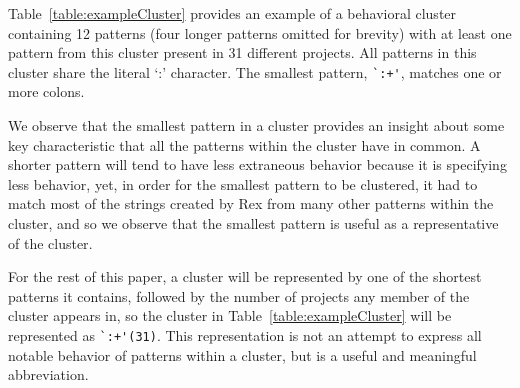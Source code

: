 


Table~\ref{table:exampleCluster} provides an example of a behavioral cluster containing 12 patterns (four longer patterns omitted for brevity) with at least one pattern from this cluster present in 31 different projects.  All patterns in this cluster share the literal `:' character. The smallest pattern, \verb!`:+'!,  matches one or more colons.



We observe that the smallest pattern in a cluster provides an insight about some key characteristic that all the patterns within the cluster have in common.  A shorter pattern will tend to have less extraneous behavior because it is specifying less behavior,
yet, in order for the smallest pattern to be clustered, it had to match most of the strings created by Rex from many other patterns within the cluster, and so we observe that {the smallest pattern is useful as a representative of the cluster}.

For the rest of this paper, a cluster will be represented by one of the shortest patterns it contains, followed by the number of projects any member of the cluster appears in, so the cluster in Table~\ref{table:exampleCluster} will be represented as \verb!`:+'(31)!.  This representation is not an attempt to express all notable behavior of patterns within a cluster, but is a useful and meaningful abbreviation.

